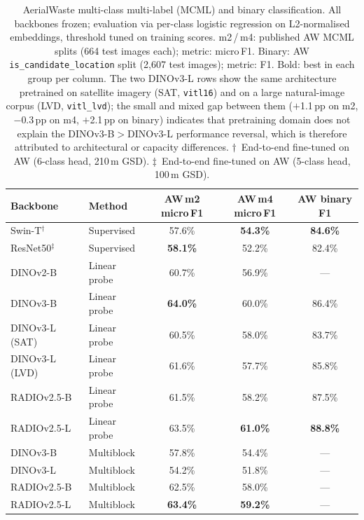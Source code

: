 \begin{table}[t]
\centering
\caption{%
  AerialWaste multi-class multi-label (MCML) and binary classification.
  All backbones frozen; evaluation via per-class logistic regression on
  L2-normalised embeddings, threshold tuned on training scores.
  m2\,/\,m4: published AW MCML splits (664 test images each);
  metric: micro\,F1.
  Binary: AW \texttt{is\_candidate\_location} split (2{,}607 test images);
  metric: F1.
  Bold: best in each group per column.
  The two DINOv3-L rows show the same architecture pretrained on satellite
  imagery (SAT, \texttt{vitl16}) and on a large natural-image corpus
  (LVD, \texttt{vitl\_lvd}); the small and mixed gap between them ($+$1.1\,pp
  on m2, $-$0.3\,pp on m4, $+$2.1\,pp on binary) indicates that pretraining
  domain does not explain the DINOv3-B$>$DINOv3-L performance reversal,
  which is therefore attributed to architectural or capacity differences.
  $\dagger$~End-to-end fine-tuned on AW (6-class head, 210\,m GSD).
  $\ddagger$~End-to-end fine-tuned on AW (5-class head, 100\,m GSD).
}
\label{tab:aw-classification}
\begin{tabular}{llccc}
\toprule
Backbone & Method & AW\,m2 micro\,F1 & AW\,m4 micro\,F1 & AW binary F1 \\
\midrule
Swin-T$^\dagger$    & Supervised   & 57.6\% & \textbf{54.3\%} & \textbf{84.6\%} \\
ResNet50$^\ddagger$ & Supervised   & \textbf{58.1\%} & 52.2\% & 82.4\% \\
\midrule
DINOv2-B      & Linear probe & 60.7\% & 56.9\% & ---             \\
DINOv3-B      & Linear probe & \textbf{64.0\%} & 60.0\% & 86.4\% \\
DINOv3-L (SAT) & Linear probe & 60.5\% & 58.0\% & 83.7\%          \\
DINOv3-L (LVD) & Linear probe & 61.6\% & 57.7\% & 85.8\%          \\
RADIOv2.5-B   & Linear probe & 61.5\% & 58.2\% & 87.5\%          \\
RADIOv2.5-L   & Linear probe & 63.5\% & \textbf{61.0\%} & \textbf{88.8\%} \\
\midrule
DINOv3-B      & Multiblock   & 57.8\% & 54.4\% & ---             \\
DINOv3-L      & Multiblock   & 54.2\% & 51.8\% & ---             \\
RADIOv2.5-B   & Multiblock   & 62.5\% & 58.0\% & ---             \\
RADIOv2.5-L   & Multiblock   & \textbf{63.4\%} & \textbf{59.2\%} & --- \\
\bottomrule
\end{tabular}
\end{table}


